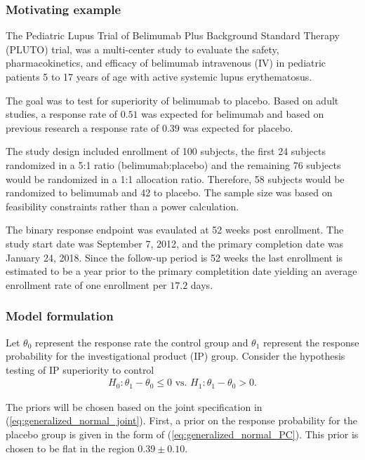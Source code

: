 \documentclass[12pt]{article}
\begin{document}
\subsubsection{Motivating example}
The Pediatric Lupus Trial of Belimumab Plus Background Standard Therapy (PLUTO) trial, was a multi-center study to evaluate the safety, pharmacokinetics, and efficacy of belimumab intravenous (IV) in pediatric patients 5 to 17 years of age with active systemic lupus erythematosus. 

The goal was to test for superiority of belimumab to placebo. Based on adult studies, a response rate of $0.51$ was expected for belimumab and based on previous research a response rate of $0.39$ was expected for placebo.

The study design included enrollment of 100 subjects, the first 24 subjects randomized in a 5:1 ratio (belimumab:placebo) and the remaining 76 subjects would be randomized in a 1:1 allocation ratio. Therefore, 58 subjects would be randomized to belimumab and 42 to placebo. The sample size was based on feasibility constraints rather than a power calculation.

The binary response endpoint was evaulated at 52 weeks post enrollment. The study start date was September 7, 2012, and the primary completion date was January 24, 2018. Since the follow-up period is 52 weeks the last enrollment is estimated to be a year prior to the primary completition date yielding an average enrollment rate of one enrollment per $17.2$ days.
\subsubsection{Model formulation}
Let $\theta_0$ represent the response rate the control group and $\theta_1$ represent the response probability for the investigational product (IP) group. 
Consider the hypothesis testing of IP superiority to control
\begin{align*}
H_0:\theta_1-\theta_0\leq 0\text{ vs. }H_1: \theta_1-\theta_0>0.
\end{align*}

The priors will be chosen based on the joint specification in (\ref{eq:generalized_normal_joint}). First, a prior on the response probability for the placebo group is given in the form of (\ref{eq:generalized_normal_PC}). This prior is chosen to be flat in the region $0.39\pm 0.10$.
\end{document}
